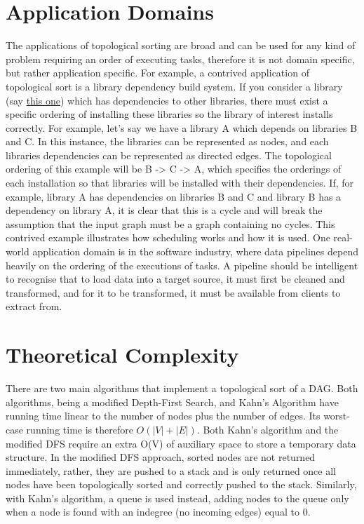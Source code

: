 \documentclass[12pt]{article}
\begin{document}
\section{Application Domains}
The applications of topological sorting are broad and can be used for any kind of problem requiring an order of executing tasks, therefore it is not domain specific, but rather application specific. For example, a contrived application of topological sort is a library dependency build system. If you consider a library (say \href{https://ocaml.org/p/ppx_expect/v0.15.0/doc/index.html}{this one}) which has dependencies to other libraries, there must exist a specific ordering of installing these libraries so the library of interest installs correctly. For example, let’s say we have a library A which depends on libraries B and C. In this instance, the libraries can be represented as nodes, and each libraries dependencies can be represented as directed edges. The topological ordering of this example will be B -> C -> A, which specifies the orderings of each installation so that libraries will be installed with their dependencies. If, for example, library A has dependencies on libraries B and C and library B has a dependency on library A, it is clear that this is a cycle and will break the assumption that the input graph must be a graph containing no cycles. This contrived example illustrates how scheduling works and how it is used. One real-world application domain is in the software industry, where data pipelines depend heavily on the ordering of the executions of tasks. A pipeline should be intelligent to recognise that to load data into a target source, it must first be cleaned and transformed, and for it to be transformed, it must be available from clients to extract from. 

\section{Theoretical Complexity}
There are two main algorithms that implement a topological sort of a DAG. Both algorithms, being a modified Depth-First Search, and Kahn’s Algorithm have running time linear to the number of nodes plus the number of edges. Its worst-case running time is therefore $O(|V|+|E|)$. Both Kahn’s algorithm and the modified DFS require an extra O(V) of auxiliary space to store a temporary data structure. In the modified DFS approach, sorted nodes are not returned immediately, rather, they are pushed to a stack and is only returned once all nodes have been topologically sorted and correctly pushed to the stack. Similarly, with Kahn’s algorithm, a queue is used instead, adding nodes to the queue only when a node is found with an indegree (no incoming edges) equal to 0. 
\end{document}
